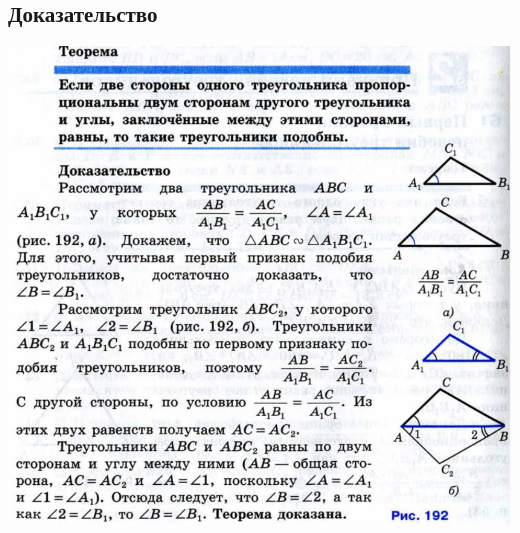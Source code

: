 \documentclass[12pt, letterpaper]{article}
\begin{document}
\subsection{Доказательство}
\includegraphics[scale=0.3]{photo8.jpg} \\
\end{document}
